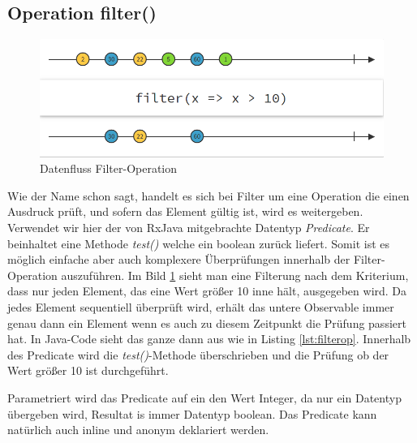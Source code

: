 \subsection{Operation filter()}
\begin{figure}
	\centering
	\includegraphics[width=1\textwidth]{Abb/filter}
	\caption{Datenfluss Filter-Operation}
	\label{pic:filter}
\end{figure}
Wie der Name schon sagt, handelt es sich bei Filter um eine Operation die einen Ausdruck prüft, und sofern das Element gültig ist, wird es weitergeben. Verwendet wir hier der von RxJava mitgebrachte Datentyp \textit{Predicate}. Er beinhaltet eine Methode \textit{test()} welche ein boolean zurück liefert. Somit ist es möglich einfache aber auch komplexere Überprüfungen innerhalb der Filter-Operation auszuführen. Im Bild \ref{pic:filter} sieht man eine Filterung nach dem Kriterium, dass nur jeden Element, das eine Wert größer 10 inne hält, ausgegeben wird. Da jedes Element sequentiell überprüft wird, erhält das untere Observable immer genau dann ein Element wenn es auch zu diesem Zeitpunkt die Prüfung passiert hat. In Java-Code sieht das ganze dann aus wie in Listing \ref{lst:filterop}. Innerhalb des Predicate wird die \textit{test()}-Methode überschrieben und die Prüfung ob der Wert größer 10 ist durchgeführt. 
 
Parametriert wird das Predicate auf ein den Wert Integer, da nur ein Datentyp übergeben wird, Resultat is immer Datentyp boolean. Das Predicate kann natürlich auch inline und anonym deklariert werden.
